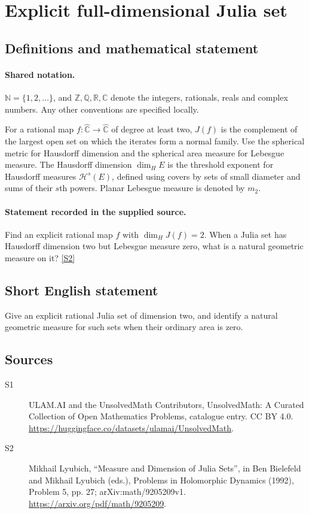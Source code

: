 \documentclass[11pt]{article}
\newcommand{\sref}[2]{\hyperlink{source:#1:#2}{[S#2]}}
\begin{document}
\section{Explicit full-dimensional Julia set}\label{statement}

\subsection{Definitions and mathematical statement}

\paragraph{Shared notation.}$\mathbb N=\{1,2,\ldots\}$, and $\mathbb Z,\mathbb Q,\mathbb R,\mathbb C$ denote the integers, rationals, reals and complex numbers. Any other conventions are specified locally.


For a rational map $f:\widehat{\mathbb C}\to\widehat{\mathbb C}$ of degree at least two, $J(f)$ is the complement of the largest open set on which the iterates form a normal family. Use the spherical metric for Hausdorff dimension and the spherical area measure for Lebesgue measure. The Hausdorff dimension $\dim_H E$ is the threshold exponent for Hausdorff measures $\mathcal H^s(E)$, defined using covers by sets of small diameter and sums of their $s$th powers. Planar Lebesgue measure is denoted by $m_2$.
\paragraph{Statement recorded in the supplied source.}
Find an explicit rational map $f$ with $\dim_HJ(f)=2$. When a Julia set has Hausdorff dimension two but Lebesgue measure zero, what is a natural geometric measure on it? \sref{statement}{2}
\subsection{Short English statement}
Give an explicit rational Julia set of dimension two, and identify a natural geometric measure for such sets when their ordinary area is zero.
\subsection{Sources}
\begin{description}
\item[\hypertarget{source:statement:1}{S1}] ULAM.AI and the UnsolvedMath Contributors, UnsolvedMath: A Curated Collection of Open Mathematics Problems, catalogue entry. CC BY 4.0. \url{https://huggingface.co/datasets/ulamai/UnsolvedMath}.
\item[\hypertarget{source:statement:2}{S2}] Mikhail Lyubich, ``Measure and Dimension of Julia Sets'', in Ben Bielefeld and Mikhail Lyubich (eds.), Problems in Holomorphic Dynamics (1992), Problem 5, pp. 27; arXiv:math/9205209v1. \url{https://arxiv.org/pdf/math/9205209}.
\end{description}
\label{end:statement}
\end{document}
